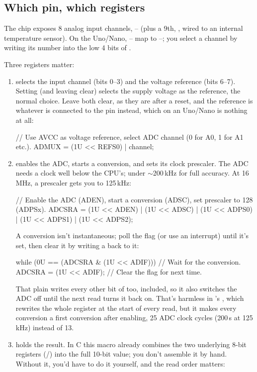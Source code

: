 \subsection{Which pin, which registers}
\label{c4:a:2}
The chip exposes 8 analog input channels, -- (plus a 9th, , wired
to an internal temperature sensor). On the Uno/Nano, -- map to
--; you select a channel by writing its number into the low 4 bits of
.

Three registers matter:
\begin{enumerate}
  \item \textbf{} selects the input channel (bits 0--3) and the voltage reference
    (bits 6--7). Setting  (and leaving  clear) selects the supply voltage
     as the reference, the normal choice. Leave both clear, as they are after a reset,
    and the reference is whatever is connected to the  pin instead, which on an
    Uno/Nano is nothing at all:

\begin{ccode}
// Use AVCC as voltage reference, select ADC channel (0 for A0, 1 for A1 etc.).
ADMUX = (1U << REFS0) | channel;
\end{ccode}
  \item \textbf{} enables the ADC, starts a conversion, and sets its clock prescaler.
    The ADC needs a clock well below the CPU's; under $\sim$200\,kHz for full accuracy. At
    16\,MHz, a  prescaler gets you to 125\,kHz:

\begin{ccode}
// Enable the ADC (ADEN), start a conversion (ADSC), set prescaler to 128 (ADPSx).
ADCSRA = (1U << ADEN) | (1U << ADSC) | (1U << ADPS0) | (1U << ADPS1) | (1U << ADPS2);
\end{ccode}

    A conversion isn't instantaneous; poll the  flag (or use an interrupt) until it's
    set, then clear it by writing a  back to it:

\begin{ccode}
while (0U == (ADCSRA & (1U << ADIF))) {} // Wait for the conversion.
ADCSRA = (1U << ADIF);                   // Clear the flag for next time.
\end{ccode}

    \noindent That plain \code{=} writes every other bit of  too,  included,
    so it also switches the ADC off until the next read turns it back on. That's harmless in
    's , which rewrites the whole register at the start of every
    read, but it makes every conversion a first conversion after enabling, 25 ADC clock cycles
    (200\,\textmu s at 125\,kHz) instead of 13.
  \item \textbf{} holds the result. In C this macro already combines the two underlying
    8-bit registers (/) into the full 10-bit value; you don't assemble it by
    hand. Without it, you'd have to do it yourself, and the read order matters:


\end{enumerate}
